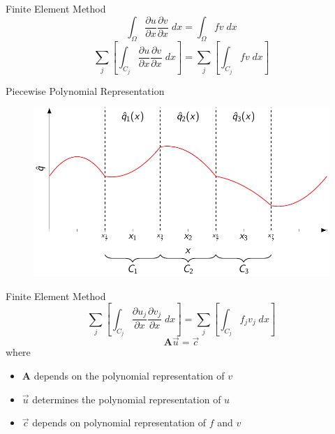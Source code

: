 \documentclass[handout]{beamer}
\begin{document}
\begin{frame}{Finite Element Method}
	\[
	 \int_{\Omega }\frac{\partial {u}}{\partial x} \frac{\partial {v}}{\partial x} \; dx  = \int_{\Omega } f v \; dx
	\]
	\[
	 \sum_j  \left[\int_{C_j} \frac{\partial {u}}{\partial x} \frac{\partial {v}}{\partial x} \; dx \right] = \sum_j \left[ \int_{C_j} f v  \; dx \right]
	\]

\end{frame}
\begin{frame}{Piecewise Polynomial Representation}
	\begin{figure}
		\includegraphics[width=\textwidth]{./Pics/PolyRep/P2.pdf}
	\end{figure}
\end{frame}


\begin{frame}{Finite Element Method}
	\[
	  \sum_j  \left[\int_{C_j} \frac{\partial {u_j }}{\partial x} \frac{\partial {v_j }}{\partial x} \; dx\right]  = \sum_j \left[ \int_{C_j} f_j v_j  \; dx \right]
	\]
	\begin{equation*}
	\boldsymbol{A} \vec{u} = \vec{c}
	\end{equation*}
	where 
	\begin{itemize}
		\item $\boldsymbol{A}$ depends on the polynomial representation of $v$
		\item $\vec{u}$ determines the polynomial representation of $u$
		\item $\vec{c}$ depends on polynomial representation of $f$ and $v$
	\end{itemize}
\end{frame}
\end{document}
